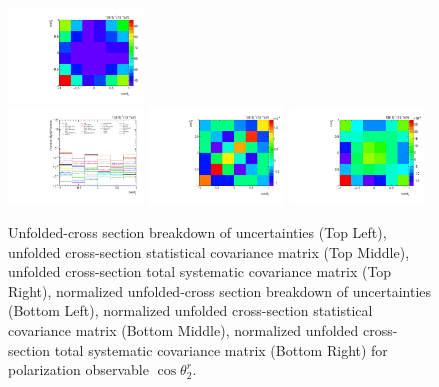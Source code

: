 \begin{refsection}
\begin{figure}[htb]
\begin{center}
 \includegraphics[width=0.32\textwidth]{fig_fullRun2UL/unfolding/combined/TotalSystCovMatrix_rebinnedB_b2r.pdf} \\
 \includegraphics[width=0.32\textwidth]{fig_fullRun2UL/unfolding/combined/deltaSystCombinedlogNorm_rebinnedB_b2r.pdf}
 \includegraphics[width=0.32\textwidth]{fig_fullRun2UL/unfolding/combined/StatCovMatrixNorm_rebinnedB_b2r.pdf}
 \includegraphics[width=0.32\textwidth]{fig_fullRun2UL/unfolding/combined/TotalSystCovMatrixNorm_rebinnedB_b2r.pdf} \\
\caption{Unfolded-cross section breakdown of uncertainties (Top Left), unfolded cross-section statistical covariance matrix (Top Middle), unfolded cross-section total systematic covariance matrix (Top Right), normalized unfolded-cross section breakdown of uncertainties (Bottom Left), normalized unfolded cross-section statistical covariance matrix (Bottom Middle), normalized unfolded cross-section total systematic covariance matrix (Bottom Right) for polarization observable $\cos\theta_{2}^{r}$.}
\label{fig:b2r_uncertainties}
\end{center}
\end{figure}
\clearpage
\begin{figure}[htb]
\begin{center}

\end{center}
\end{figure}
\end{refsection}
